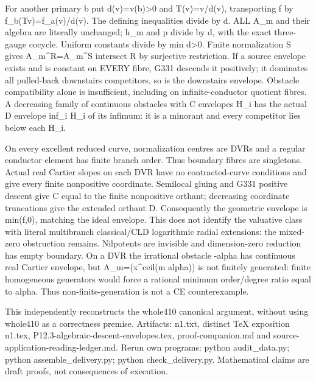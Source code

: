 \documentclass[11pt]{article}
\begin{document}
For another primary b put d(v)=v(b)\textgreater{}0 and T(v)=v/d(v), transporting f by f\_b(Tv)=f\_a(v)/d(v). The defining inequalities divide by d. ALL A\_m and their algebra are literally unchanged; h\_m and p divide by d, with the exact three-gauge cocycle. Uniform constants divide by min d\textgreater{}0. Finite normalization S gives A\_m\textasciicircum{}R=A\_m\textasciicircum{}S intersect R by surjective restriction. If a source envelope exists and is constant on EVERY fibre, G331 descends it positively; it dominates all pulled-back downstairs competitors, so is the downstairs envelope. Obstacle compatibility alone is insufficient, including on infinite-conductor quotient fibres. A decreasing family of continuous obstacles with C envelopes H\_i has the actual D envelope inf\_i H\_i of its infimum: it is a minorant and every competitor lies below each H\_i.

On every excellent reduced curve, normalization centres are DVRs and a regular conductor element has finite branch order. Thus boundary fibres are singletons. Actual real Cartier slopes on each DVR have no contracted-curve conditions and give every finite nonpositive coordinate. Semilocal gluing and G331 positive descent give C equal to the finite nonpositive orthant; decreasing coordinate truncations give the extended orthant D. Consequently the geometric envelope is min(f,0), matching the ideal envelope. This does not identify the valuative class with literal multibranch classical/CLD logarithmic radial extensions: the mixed-zero obstruction remains. Nilpotents are invisible and dimension-zero reduction has empty boundary. On a DVR the irrational obstacle -alpha has continuous real Cartier envelope, but A\_m=(x\textasciicircum{}ceil(m alpha)) is not finitely generated: finite homogeneous generators would force a rational minimum order/degree ratio equal to alpha. Thus non-finite-generation is not a CE counterexample.

This independently reconstructs the whole410 canonical argument, without using whole410 as a correctness premise. Artifacts: n1.txt, distinct TeX exposition n1.tex, P12.3-algebraic-descent-envelopes.tex, proof-companion.md and source-application-reading-ledger.md. Rerun own programs: python audit\_data.py; python assemble\_delivery.py; python check\_delivery.py. Mathematical claims are draft proofs, not consequences of execution.
\end{document}
